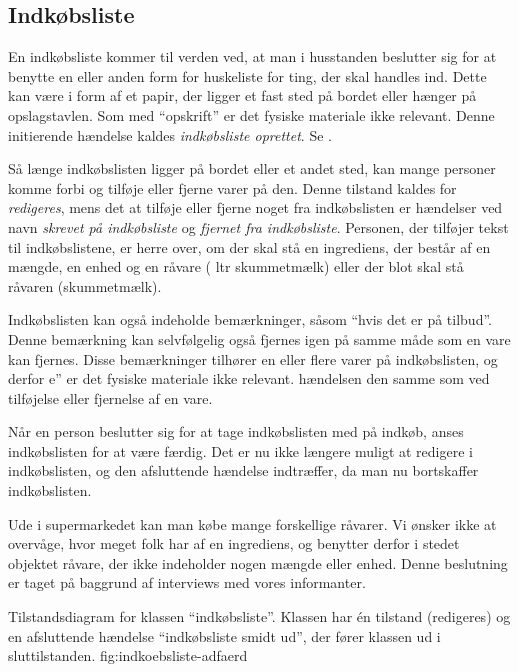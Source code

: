 \subsection{Indkøbsliste}
En indkøbsliste kommer til verden ved, at man i husstanden beslutter sig for at benytte en eller anden form for huskeliste for ting, der skal handles ind. Dette kan være i form af et papir, der ligger et fast sted på bordet eller hænger på opslagstavlen. Som med ``opskrift'' er det fysiske materiale ikke relevant. Denne initierende hændelse kaldes \textit{indkøbsliste oprettet}. Se .

Så længe indkøbslisten ligger på bordet eller et andet sted, kan mange personer komme forbi og tilføje eller fjerne varer på den. Denne tilstand kaldes for \textit{redigeres}, mens det at tilføje eller fjerne noget fra indkøbslisten er hændelser ved navn \textit{skrevet på indkøbsliste} og \textit{fjernet fra indkøbsliste}. Personen, der tilføjer tekst til indkøbslistene, er herre over, om der skal stå en ingrediens, der består af en mængde, en enhed og en råvare ( ltr skummetmælk) eller der blot skal stå råvaren (\fx skummetmælk).

Indkøbslisten kan også indeholde bemærkninger, såsom ``hvis det er på tilbud''. Denne bemærkning kan selvfølgelig også fjernes igen på samme måde som en vare kan fjernes. Disse bemærkninger tilhører en eller flere varer på indkøbslisten, og derfor e'' er det fysiske materiale ikke relevant.  hændelsen den samme som ved tilføjelse eller fjernelse af en vare.

Når en person beslutter sig for at tage indkøbslisten med på indkøb, anses indkøbslisten for at være færdig. Det er nu ikke længere muligt at redigere i indkøbslisten, og den afsluttende hændelse indtræffer, da man nu bortskaffer indkøbslisten. 

Ude i supermarkedet kan man købe mange forskellige råvarer. Vi ønsker ikke at overvåge, hvor meget folk har af en ingrediens, og benytter derfor i stedet objektet råvare, der ikke indeholder nogen mængde eller enhed. Denne beslutning er taget på baggrund af interviews med vores informanter.

  {Tilstandsdiagram for klassen ``indkøbsliste''. Klassen har én tilstand (redigeres) og en afsluttende hændelse ``indkøbsliste smidt ud'', der fører klassen ud i sluttilstanden.}
  {fig:indkoebsliste-adfaerd}
